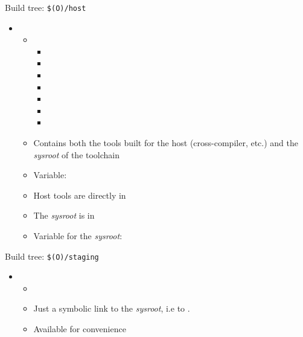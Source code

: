 \begin{frame}{Build tree: {\tt \$(O)/host}}
  \begin{itemize}
  \item {}
    \begin{itemize}
    \item {}
      \begin{itemize}
        \tiny
      \item {}
      \item {}
      \item {}
        \vspace{0.2cm}
      \item {}
      \item {}
      \item {}
      \item {}
      \end{itemize}
    \item Contains both the tools built for the host
      (cross-compiler, etc.) and the {\em sysroot} of the toolchain
    \item Variable: 
    \item Host tools are directly in 
    \item The {\em sysroot} is in 
    \item Variable for the {\em sysroot}: 
    \end{itemize}
  \end{itemize}
\end{frame}

\begin{frame}{Build tree: {\tt \$(O)/staging}}
  \begin{itemize}
  \item {}
    \begin{itemize}
    \item {}
    \item Just a symbolic link to the {\em sysroot}, i.e to
      .
    \item Available for convenience
    \end{itemize}
  \end{itemize}
\end{frame}

